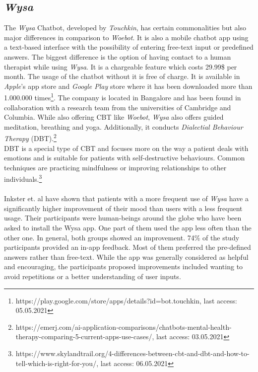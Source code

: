 \documentclass[sigconf, nonacm]{acmart}
\begin{document}
\subsection{\emph{Wysa}}
\label{sec:two_two}
The \emph{Wysa} Chatbot, developed by \emph{Touchkin}, has certain commonalities but also major differences in comparison to \emph{Woebot}. It is also a mobile chatbot app using a text-based interface with the possibility of entering 
free-text input or predefined answers. The biggest difference is the option of having contact to 
a human therapist while using \emph{Wysa}. It is a chargeable feature which costs 29.99\$ per month. The usage of the chatbot without it is free of charge. It is available
in \emph{Apple}'s app store and \emph{Google Play} store where it has been downloaded more than 1.000.000 times\footnote{https://play.google.com/store/apps/details?id=bot.touchkin, last access: 05.05.2021}. 
The company is located in Bangalore and has been found in collaboration with a research team from the universities of Cambridge and Columbia.
While also offering CBT like \emph{Woebot}, \emph{Wysa} also offers guided meditation, breathing and yoga. Additionally, it conducts \emph{Dialectial Behaviour Therapy} (DBT).\footnote{https://emerj.com/ai-application-comparisons/chatbots-mental-health-therapy-comparing-5-current-apps-use-cases/, last access: 03.05.2021}
\\
DBT is a special type of CBT and focuses more on the way a patient deals with emotions and is suitable for patients with self-destructive behaviours. Common techniques are practicing mindfulness or 
improving relationships to other individuals.\footnote{https://www.skylandtrail.org/4-differences-between-cbt-and-dbt-and-how-to-tell-which-is-right-for-you/, last access: 06.05.2021} 
\\\\
Inkster et. al \cite{Inkster} have shown that patients with a more frequent use of \emph{Wysa} have a significantly higher improvement of their mood than users
with a less frequent usage. Their participants were human-beings around the globe who have been asked to install the Wysa app. One part of them used the app less often than the other one. In general, both groups showed an improvement. 74\% of the study participants provided an in-app feedback. Most of them preferred the pre-defined answers rather than free-text.
While the app was generally considered as helpful and encouraging, the participants proposed improvements included wanting to avoid repetitions or a better understanding of user inputs.
\end{document}
